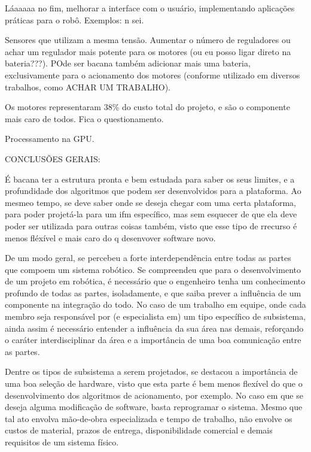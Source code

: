 Láaaaaa no fim, melhorar a interface com o usuário, implementando aplicações práticas para o robô. Exemplos: n sei.

Sensores que utilizam a mesma tensão. Aumentar o número de reguladores ou achar um regulador mais potente para os motores (ou eu posso ligar direto na bateria???). POde ser bacana também adicionar mais uma bateria, exclusivamente para o acionamento dos motores (conforme utilizado em diversos trabalhos, como ACHAR UM TRABALHO).

Os motores representaram 38\% do custo total do projeto, e são o componente mais caro de todos. Fica o questionamento.

Processamento na GPU.

CONCLUSÕES GERAIS:

É bacana ter a estrutura pronta e bem estudada para saber os seus limites, e a profundidade dos algoritmos que podem ser desenvolvidos para a plataforma. Ao mesmeo tempo, se deve saber onde se deseja chegar com uma certa plataforma, para poder projetá-la para um ifm específico, mas sem esquecer de que ela deve poder ser utilizada para outras coisas também, visto que esse tipo de rrecurso é menos fléxível e mais caro do q desenvover software novo.

De um modo geral, se percebeu a forte interdependência entre todas as partes que compoem um sistema robótico. Se compreendeu que para o desenvolvimento de um projeto em robótica, é necessário que o engenheiro tenha um conhecimento profundo de todas as partes, isoladamente, e que saiba prever a influência de um componente na integração do todo. No caso de um trabalho em equipe, onde cada membro seja responsável por (e especialista em) um tipo específico de subsistema, ainda assim é necessário entender a influência da sua área nas demais, reforçando o caráter interdisciplinar da área e a importância de uma boa comunicação entre as partes.

Dentre os tipos de subsistema a serem projetados, se destacou a importância de uma boa seleção de hardware, visto que esta parte é bem menos flexível do que o desenvolvimento dos algoritmos de acionamento, por exemplo. No caso em que se deseja alguma modificação de software, basta reprogramar o sistema. Mesmo que tal ato envolva mão-de-obra especializada e tempo de trabalho, não envolve os custos de material, prazos de entrega, disponibilidade comercial e demais requisitos de um sistema físico.
